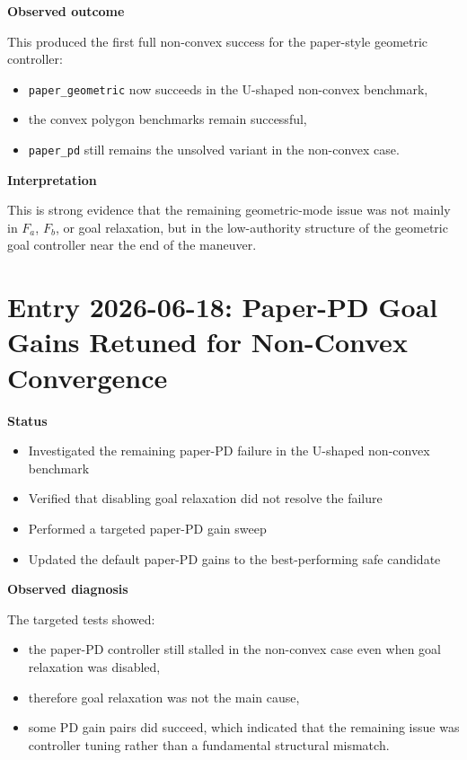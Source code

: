 \documentclass[11pt]{article}
\begin{document}
\textbf{Observed outcome}

This produced the first full non-convex success for the paper-style geometric
controller:

\begin{itemize}[leftmargin=*]
  \item \texttt{paper\_geometric} now succeeds in the U-shaped non-convex benchmark,
  \item the convex polygon benchmarks remain successful,
  \item \texttt{paper\_pd} still remains the unsolved variant in the non-convex case.
\end{itemize}

\textbf{Interpretation}

This is strong evidence that the remaining geometric-mode issue was not mainly
in \(F_a\), \(F_b\), or goal relaxation, but in the low-authority structure of
the geometric goal controller near the end of the maneuver.

\section*{Entry 2026-06-18: Paper-PD Goal Gains Retuned for Non-Convex Convergence}

\textbf{Status}

\begin{itemize}[leftmargin=*]
  \item Investigated the remaining paper-PD failure in the U-shaped non-convex benchmark
  \item Verified that disabling goal relaxation did not resolve the failure
  \item Performed a targeted paper-PD gain sweep
  \item Updated the default paper-PD gains to the best-performing safe candidate
\end{itemize}

\textbf{Observed diagnosis}

The targeted tests showed:

\begin{itemize}[leftmargin=*]
  \item the paper-PD controller still stalled in the non-convex case even when goal relaxation was disabled,
  \item therefore goal relaxation was not the main cause,
  \item some PD gain pairs did succeed, which indicated that the remaining issue was controller tuning rather than a fundamental structural mismatch.
\end{itemize}
\end{document}
